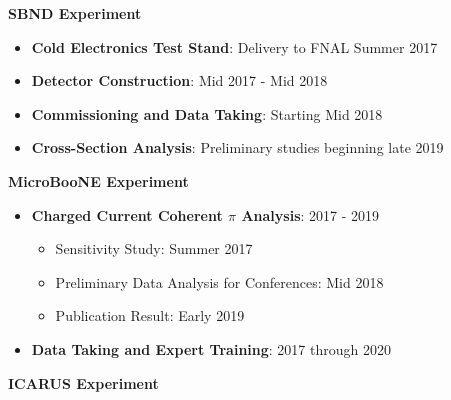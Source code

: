 \noindent\textbf{SBND Experiment}
\begin{itemize}[noitemsep,nolistsep]
\item{\textbf{Cold Electronics Test Stand}}: Delivery to FNAL Summer 2017
\item{\textbf{Detector Construction}}: Mid 2017 - Mid 2018
\item{\textbf{Commissioning and Data Taking}}: Starting Mid 2018 
\item{\textbf{Cross-Section Analysis}}: Preliminary studies beginning late 2019

\end{itemize}

\noindent\textbf{MicroBooNE Experiment}
\begin{itemize}[noitemsep,nolistsep]
\item{\textbf{Charged Current Coherent $\pi$ Analysis}}: 2017 - 2019
\begin{itemize}[noitemsep,nolistsep]
\item{Sensitivity Study: Summer 2017}
\item{Preliminary Data Analysis for Conferences: Mid 2018}
\item{Publication Result: Early 2019}
\end{itemize}

\item{\textbf{Data Taking and Expert Training}}: 2017 through 2020

\end{itemize}


\noindent\textbf{ICARUS Experiment}





